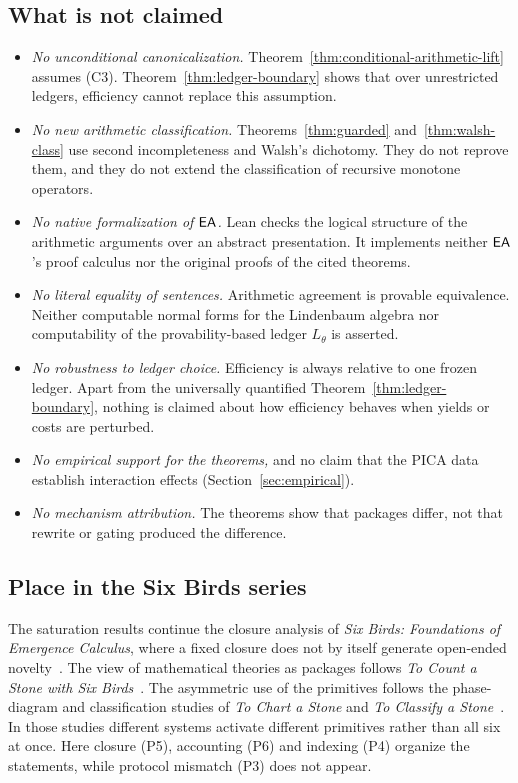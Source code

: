 \subsection{What is not claimed}

\begin{itemize}[leftmargin=*, itemsep=2pt]
\item \emph{No unconditional canonicalization.} Theorem~\ref{thm:conditional-arithmetic-lift} assumes (C3). Theorem~\ref{thm:ledger-boundary} shows that over unrestricted ledgers, efficiency cannot replace this assumption.
\item \emph{No new arithmetic classification.} Theorems~\ref{thm:guarded} and~\ref{thm:walsh-class} use second incompleteness and Walsh's dichotomy. They do not reprove them, and they do not extend the classification of recursive monotone operators.
\item \emph{No native formalization of $\mathsf{EA}$.} Lean checks the logical structure of the arithmetic arguments over an abstract presentation. It implements neither $\mathsf{EA}$'s proof calculus nor the original proofs of the cited theorems.
\item \emph{No literal equality of sentences.} Arithmetic agreement is provable equivalence. Neither computable normal forms for the Lindenbaum algebra nor computability of the provability-based ledger $L_\theta$ is asserted.
\item \emph{No robustness to ledger choice.} Efficiency is always relative to one frozen ledger. Apart from the universally quantified Theorem~\ref{thm:ledger-boundary}, nothing is claimed about how efficiency behaves when yields or costs are perturbed.
\item \emph{No empirical support for the theorems,} and no claim that the PICA data establish interaction effects (Section~\ref{sec:empirical}).
\item \emph{No mechanism attribution.} The theorems show that packages differ, not that rewrite or gating produced the difference.
\end{itemize}

\subsection{Place in the Six Birds series}

The saturation results continue the closure analysis of \emph{Six Birds: Foundations of Emergence Calculus}, where a fixed closure does not by itself generate open-ended novelty~\cite{Tsiokos2026Foundations}. The view of mathematical theories as packages follows \emph{To Count a Stone with Six Birds}~\cite{Tsiokos2026ToCount}. The asymmetric use of the primitives follows the phase-diagram and classification studies of \emph{To Chart a Stone} and \emph{To Classify a Stone}~\cite{Tsiokos2026ToChart,Tsiokos2026ToClassify}. In those studies different systems activate different primitives rather than all six at once. Here closure (P5), accounting (P6) and indexing (P4) organize the statements, while protocol mismatch (P3) does not appear.

